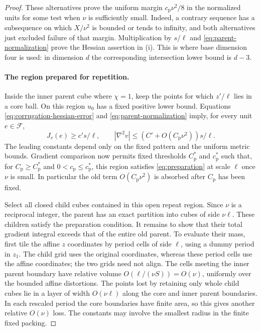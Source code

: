 \begin{proof}
These alternatives prove the uniform margin
$c_{\mathrm p}\nu^2/8$ in the normalized units for some test when
$\nu$ is sufficiently small.  Indeed, a contrary
sequence has a subsequence on which $X/\nu^2$ is bounded or tends
to infinity, and both alternatives just excluded failure of that
margin.  Multiplication by $s/\ell$ and
\eqref{eq:parent-normalization} prove the Hessian assertion in
\textup{(i)}.  This is where base dimension four is used: in
dimension $d$ the corresponding intersection lower bound is $d-3$.

\paragraph{The region prepared for repetition.}
Inside the inner parent cube where $\chi=1$, keep the points for
which $z'/\ell$ lies in a core ball.  On this region $u_0$ has a
fixed positive lower bound.  Equations
\eqref{eq:corrugation-hessian-error} and
\eqref{eq:parent-normalization} imply, for every unit
$e\in\mathcal F$,
\[
 J_v(e)\ge c' s/\ell,
 \qquad
 |\nabla^2v|\le(C'+O(C_{\mathrm p}\nu^2))s/\ell.
\]
The leading constants depend only on the fixed pattern and the
uniform metric bounds.  Gradient comparison now permits fixed
thresholds $C_{\mathrm p}^*$ and $c_{\mathrm p}^*$ such that, for
$C_{\mathrm p}\ge C_{\mathrm p}^*$ and
$0<c_{\mathrm p}\le c_{\mathrm p}^*$, this region satisfies
\eqref{eq:preparation} at scale $\ell$ once $\nu$ is small.
In particular the old term $O(C_{\mathrm p}\nu^2)$ is absorbed
after $C_{\mathrm p}$ has been fixed.

Select all closed child cubes contained in this open repeat region.
Since $\nu$ is a reciprocal integer, the parent has an exact
partition into cubes of side $\nu\ell$.  These children satisfy the
preparation condition.  It remains to show that their total gradient
integral exceeds that of the entire old parent.  To evaluate their mass,
first tile the affine $z$ coordinates by period cells of side
$\ell$, using a dummy period in $z_1$.  The child grid uses the original
coordinates, whereas these period cells use the affine coordinates;
the two grids need not align.  The cells meeting the inner
parent boundary have relative volume
$O(\ell/(\nu S))=O(\nu)$, uniformly over the bounded affine
distortions.  The points lost by retaining only whole child cubes
lie in a layer of width $O(\nu\ell)$ along the core and inner
parent boundaries.  In each rescaled period the core boundaries
have finite area, so this gives another relative $O(\nu)$ loss.
The constants may involve the smallest radius in the finite fixed
packing.


\end{proof}

